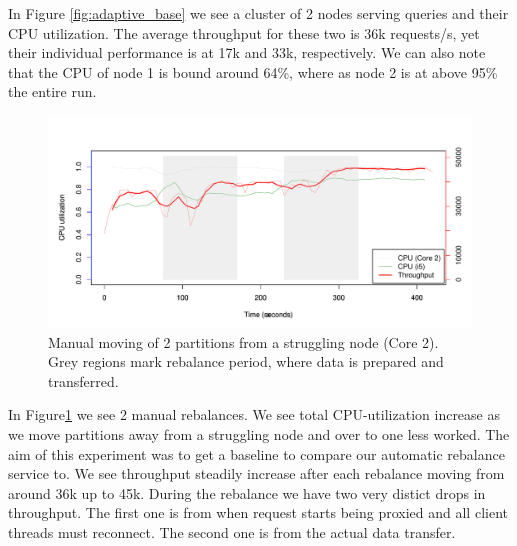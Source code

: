 In Figure \ref{fig:adaptive_base} we see a cluster of 2 nodes serving queries and their CPU utilization. The average throughput for these two is 36k requests/s, yet their individual performance is at 17k and 33k, respectively. We can also note that the CPU of node 1 is bound around 64\%, where as node 2 is at above 95\% the entire run.

\clearpage
\begin{figure}[h]
    \centering
    \includegraphics[width=1.2\textwidth]{results/rebalance_manual_2node}
    \caption{Manual moving of 2 partitions from a struggling node (Core 2). Grey regions mark rebalance period, where data is prepared and transferred.}
    \label{fig:adaptive_man}
\end{figure}

In Figure\ref{fig:adaptive_man} we see 2 manual rebalances. We see total CPU-utilization increase as we move partitions away from a struggling node and over to one less worked. The aim of this experiment was to get a baseline to compare our automatic rebalance service to. We see throughput steadily increase after each rebalance moving from around 36k up to 45k. During the rebalance we have two very distict drops in throughput. The first one is from when request starts being proxied and all client threads must reconnect. The second one is from the actual data transfer. 

